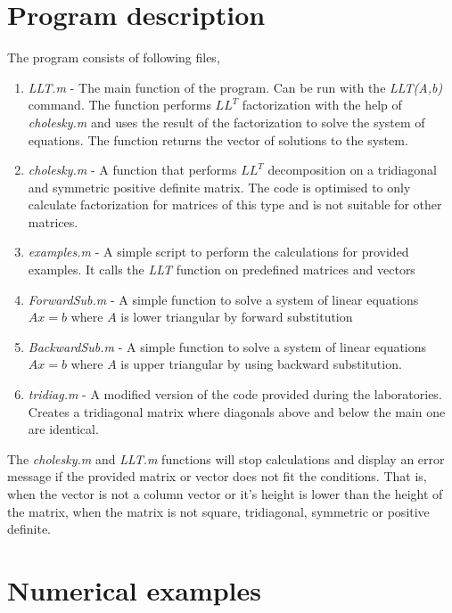 \documentclass[12pt]{article}
\begin{document}
\section{Program description}
The program consists of following files,
\begin{enumerate}
\item \textit{LLT.m} - The main function of the program. Can be run with the \textit{LLT(A,b)} command. The function performs $LL^T$ factorization with the help of \textit{cholesky.m} and uses the result of the factorization to solve the system of equations. The function returns the vector of solutions to the system.
\item \textit{cholesky.m} - A function that performs $LL^T$ decomposition on a tridiagonal and symmetric positive definite matrix. The code is optimised to only calculate factorization for matrices of this type and is not suitable for other matrices.
\item \textit{examples.m} - A simple script to perform the calculations for provided examples. It calls the \textit{LLT} function on predefined matrices and vectors
\item \textit{ForwardSub.m} - A simple function to solve a system of linear equations $Ax=b$  where $A$ is lower triangular by forward substitution
\item \textit{BackwardSub.m} - A simple function to solve a system of linear equations $Ax=b$
where $A$ is upper triangular by using backward substitution.
\item \textit{tridiag.m} - A modified version of the code provided during the laboratories. Creates a tridiagonal matrix where diagonals above and below the main one are identical.
\end{enumerate}
The \textit{cholesky.m} and \textit{LLT.m} functions will stop calculations and display an error message if the provided matrix or vector does not fit the conditions. That is, when the vector is not a column vector or it's height is lower than the height of the matrix, when the matrix is not square, tridiagonal, symmetric or positive definite.

\section{Numerical examples}
\end{document}
